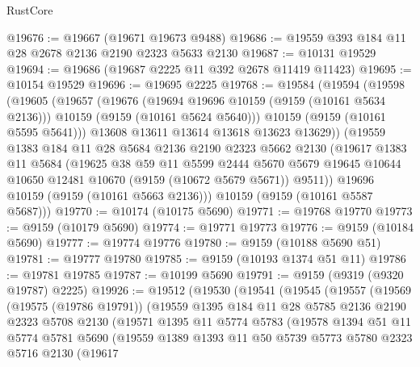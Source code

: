 \begin{lexlean}{RustCore}
\begin{coremodule}
@19676 := @19667 (@19671 @19673 @9488)
@19686 := @19559 @393 @184 @11 @28 @2678 @2136 @2190 @2323 @5633 @2130
@19687 := @10131 @19529
@19694 := @19686 (@19687 @2225 @11 @392 @2678 @11419 @11423)
@19695 := @10154 @19529
@19696 := @19695 @2225
@19768 := @19584
    (@19594
      (@19598
        (@19605
          (@19657
            (@19676
              (@19694 @19696 @10159 (@9159 (@10161 @5634 @2136)))
              @10159
              (@9159 (@10161 @5624 @5640)))
            @10159
            (@9159 (@10161 @5595 @5641)))
          @13608
          @13611
          @13614
          @13618
          @13623
          @13629))
      (@19559
        @1383
        @184
        @11
        @28
        @5684
        @2136
        @2190
        @2323
        @5662
        @2130
        (@19617
          @1383
          @11
          @5684
          (@19625
            @38
            @59
            @11
            @5599
            @2444
            @5670
            @5679
            @19645
            @10644
            @10650
            @12481
            @10670
            (@9159 (@10672 @5679 @5671))
            @9511))
        @19696
        @10159
        (@9159 (@10161 @5663 @2136)))
      @10159
      (@9159 (@10161 @5587 @5687)))
@19770 := @10174 (@10175 @5690)
@19771 := @19768 @19770
@19773 := @9159 (@10179 @5690)
@19774 := @19771 @19773
@19776 := @9159 (@10184 @5690)
@19777 := @19774 @19776
@19780 := @9159 (@10188 @5690 @51)
@19781 := @19777 @19780
@19785 := @9159 (@10193 @1374 @51 @11)
@19786 := @19781 @19785
@19787 := @10199 @5690
@19791 := @9159 (@9319 (@9320 @19787) @2225)
@19926 := @19512
    (@19530
      (@19541
        (@19545
          (@19557
            (@19569
              (@19575 (@19786 @19791))
              (@19559
                @1395
                @184
                @11
                @28
                @5785
                @2136
                @2190
                @2323
                @5708
                @2130
                (@19571
                  @1395
                  @11
                  @5774
                  @5783
                  (@19578
                    @1394
                    @51
                    @11
                    @5774
                    @5781
                    @5690
                    (@19559
                      @1389
                      @1393
                      @11
                      @50
                      @5739
                      @5773
                      @5780
                      @2323
                      @5716
                      @2130
                      (@19617

\end{coremodule}
\end{lexlean}
